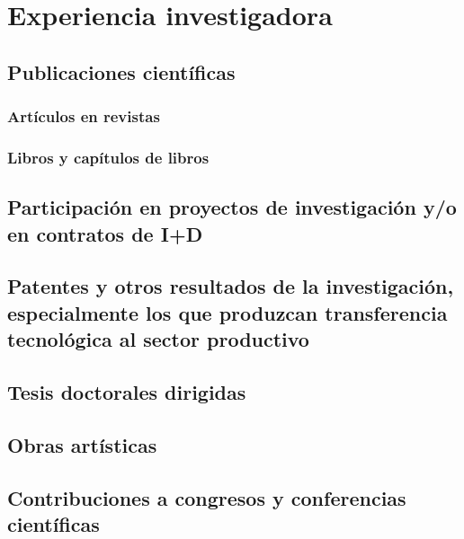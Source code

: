 \documentclass[14pt, article, twoside, a4paper]{memoir}
\begin{document}
\part{Experiencia investigadora}

\chapter{Publicaciones científicas}
\cleardoublepage 

\section{Artículos en revistas}
\cleardoublepage 


\section{Libros y capítulos de libros}
\cleardoublepage 


\cleardoublepage
\chapter{Participación en proyectos de investigación y/o en contratos de I+D}
\cleardoublepage 


\cleardoublepage
\chapter{Patentes y otros resultados de la investigación, especialmente los que produzcan transferencia tecnológica al sector productivo}
\cleardoublepage


\cleardoublepage
\chapter{Tesis doctorales dirigidas}

\cleardoublepage
\chapter{Obras artísticas}

\cleardoublepage
\chapter{Contribuciones a congresos y conferencias científicas}
\cleardoublepage 

\end{document}
